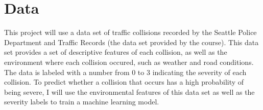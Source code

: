 \section*{Data}
This project will use a data set of traffic collisions recorded by the Seattle Police Department and Traffic Records (the data set provided by the course). This data set provides a set of descriptive features of each collision, as well as the environment where each collision occured, such as weather and road conditions. The data is labeled with a number from 0 to 3 indicating the severity of each collision. To predict whether a collision that occurs has a high probability of being severe, I will use the environmental features of this data set as well as the severity labels to train a machine learning model.
